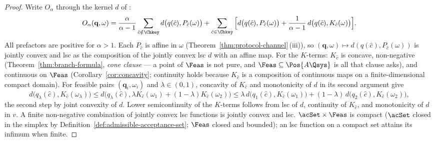 \begin{proof}
Write $O_{\alpha}$ through the kernel $d$ of :
\begin{equation*}
  O_{\alpha}(\mathbf q,\omega)
  =\frac{\alpha}{\alpha-1}\sum_{\hat c\notin\Chkey}
  d\big(q(\hat c),P_{\hat c}(\omega)\big)
  +\sum_{\hat c\in\Chkey}\Big[
  d\big(q(\hat c),P_{\hat c}(\omega)\big)
  +\frac{1}{\alpha-1}\,d\big(q(\hat c),K_{\hat c}(\omega)\big)\Big].
\end{equation*}
All prefactors are positive for $\alpha>1$. Each
$P_{\hat c}$ is affine in $\omega$ (Theorem~\ref{thm:protocol-channel}\,(iii)), so
$(\mathbf q,\omega)\mapsto d(q(\hat c),P_{\hat c}(\omega))$ is jointly
convex and lsc as the composition of the jointly convex lsc $d$ with an
affine map. For the $K$-terms: $K_{\hat c}$ is concave, non-negative
(Theorem~\ref{thm:branch-formula}, \emph{cone clause} --- a point of $\Feas$ is not
pure, and $\Feas\subseteq\Pos{A\Qsys}$ is all that clause asks), and
continuous on $\Feas$
(Corollary~\ref{cor:concavity}; continuity holds because $K_{\hat c}$ is a
composition of continuous maps on a finite-dimensional compact domain).
For feasible pairs $(\mathbf q_i,\omega_i)$ and $\lambda\in(0,1)$,
concavity of $K_{\hat c}$ and monotonicity of $d$ in its second argument
give
\begin{equation*}
  d\big(q_{\lambda}(\hat c),K_{\hat c}(\omega_{\lambda})\big)
  \le d\big(q_{\lambda}(\hat c),
  \lambda K_{\hat c}(\omega_1)+(1-\lambda)K_{\hat c}(\omega_2)\big)
  \le\lambda\,d\big(q_1(\hat c),K_{\hat c}(\omega_1)\big)
  +(1-\lambda)\,d\big(q_2(\hat c),K_{\hat c}(\omega_2)\big),
\end{equation*}
the second step by joint convexity of $d$. Lower semicontinuity of the
$K$-terms follows from lsc of $d$, continuity of $K_{\hat c}$, and
monotonicity of $d$ in $v$. A finite non-negative combination of jointly
convex lsc functions is jointly convex and lsc. $\acSet\times\Feas$ is
compact ($\acSet$ closed in the simplex by Definition~\ref{def:admissible-acceptance-set};
$\Feas$ closed and bounded); an lsc function on a compact set attains its
infimum when finite.
\end{proof}

